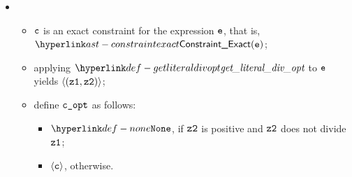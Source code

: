 \ProseParagraph
\OneApplies
\begin{itemize}
  \item {}
  \begin{itemize}
    \item $\texttt{c}$ is an exact constraint for the expression $\texttt{e}$, that is, $\ConstraintExact(\ve)$;
    \item applying $\getliteraldivopt$ to $\texttt{e}$ yields $\langle(\texttt{z1}, \texttt{z2})\rangle$\ProseTerminateAs{\None};
    \item define $\texttt{c\_opt}$ as follows:
    \begin{itemize}
      \item $\None$, if $\texttt{z2}$ is positive and $\texttt{z2}$ does not divide $\texttt{z1}$;
      \item $\langle\texttt{c}\rangle$, otherwise.
    \end{itemize}
  \end{itemize}


\end{itemize}
